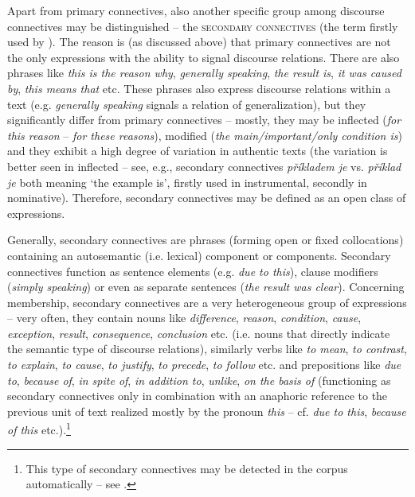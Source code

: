 \documentclass[output=paper]{langsci/langscibook.cls}
\begin{document}
Apart from primary connectives, also another specific group among discourse connectives may be distinguished – the \textsc{secondary connectives} (the term firstly used by \citealt{biblio:RyRyCentreand2014}). The reason is (as discussed above) that primary connectives are not the only expressions with the ability to signal discourse relations. There are also  phrases like \textit{this is the reason why}, \textit{generally speaking}, \textit{the result is}, \textit{it was caused by}, \textit{this means that} etc. These phrases also express discourse relations within a text (e.g. \textit{generally speaking} signals a relation of generalization), but they significantly differ from primary connectives – mostly, they may be inflected (\textit{for this reason} – \textit{for these reasons}), modified (\textit{the main/important/only condition is}) and they exhibit a high degree of variation in authentic texts (the variation is better seen in inflected  – see, e.g., secondary connectives \textit{příkladem je} vs. \textit{příklad je} both meaning `the example is', firstly used in instrumental, secondly in nominative). Therefore, secondary connectives may be defined as an open class of expressions. 


Generally, secondary connectives are  phrases (forming open or fixed collocations) containing an autosemantic (i.e. lexical) component or components. Secondary connectives function as sentence elements (e.g. \textit{due to this}), clause modifiers (\textit{simply speaking}) or even as separate sentences (\textit{the result was clear}). Concerning  membership, secondary connectives are a very heterogeneous group of expressions – very often, they contain nouns like \textit{difference}, \textit{reason}, \textit{condition}, \textit{cause}, \textit{exception}, \textit{result}, \textit{consequence}, \textit{conclusion} etc. (i.e. nouns that directly indicate the semantic type of discourse relations), similarly verbs like \textit{to mean}, \textit{to contrast}, \textit{to explain}, \textit{to cause}, \textit{to justify}, \textit{to precede}, \textit{to follow} etc. and prepositions like \textit{due to}, \textit{because of}, \textit{in spite of}, \textit{in addition to}, \textit{unlike}, \textit{on the basis of} (functioning as secondary connectives only in combination with an anaphoric reference to the previous unit of text realized mostly by the pronoun \textit{this }– cf. \textit{due to this}, \textit{because of this} etc.).\footnote{This type of secondary connectives may be detected in the corpus automatically – see	\citet{biblio:RyMiUseCoreference2014}.}
\end{document}
